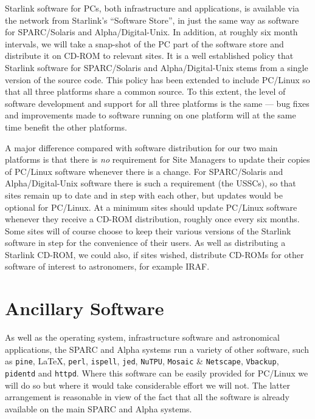 \documentclass[twoside,11pt]{article}
\newcommand{\htmladdnormallink}[2]{#1}
\begin{document}
Starlink software for PCs, both infrastructure and
applications, is available via the
network from Starlink's ``Software Store'', in just the same way as
software for SPARC/Solaris and Alpha/Digital-Unix.  In addition, at
roughly six month intervals, we will take a snap-shot of the PC
part of the software store and distribute it on CD-ROM to relevant
sites.  It is a well established policy that Starlink software for
SPARC/Solaris and Alpha/Digital-Unix stems from a single version of the
source code.  This policy has been extended to include
PC/Linux so that all three platforms share a common source.  To
this extent, the level of software development and support for all
three platforms is the same --- bug fixes and improvements made
to software running on one platform will at the same time benefit the
other platforms.

A major difference compared with software distribution for our two main
platforms is that there is {\em no} requirement for Site Managers to
update their copies of PC/Linux software whenever there is a change.
For SPARC/Solaris and Alpha/Digital-Unix software there is such a
requirement (the USSCs), so that sites remain up to date and in step
with each other,  but updates would be optional for PC/Linux.
At a minimum sites should update PC/Linux software
whenever they receive a CD-ROM distribution, roughly once every six
months. Some sites will of course choose to keep their various versions of
the Starlink software in step for the convenience of their users.
As well as distributing a Starlink CD-ROM, we could also, if
sites wished, distribute CD-ROMs for other software of interest to
astronomers, for example IRAF.


\section{Ancillary Software}

As well as the operating system, infrastructure software and
astronomical applications, the SPARC and Alpha systems run a variety of
other software, such as
\htmladdnormallink{{\tt pine}}{http://www.washington.edu/pine/}, \LaTeX,
\htmladdnormallink{{\tt perl}}{http://www.perl.com/},
\htmladdnormallink{{\tt ispell}}{http://www.gnu.org/software/ispell/ispell.html},
\htmladdnormallink{{\tt jed}}{http://www.jedsoft.org/jed/},
\htmladdnormallink{{\tt NuTPU}}{http://www.asoft-dev.com/},
{\tt Mosaic} \& {\tt Netscape},
\htmladdnormallink{{\tt Vbackup}}{http://www.bosbc.com/brvback.htm},
{\tt pidentd} and {\tt httpd}.
Where this software can be easily provided for PC/Linux
we will do so but where it would take considerable effort we will
not.  The latter arrangement is reasonable in view of the fact that all
the software is already available on the main SPARC and Alpha systems.
\end{document}
